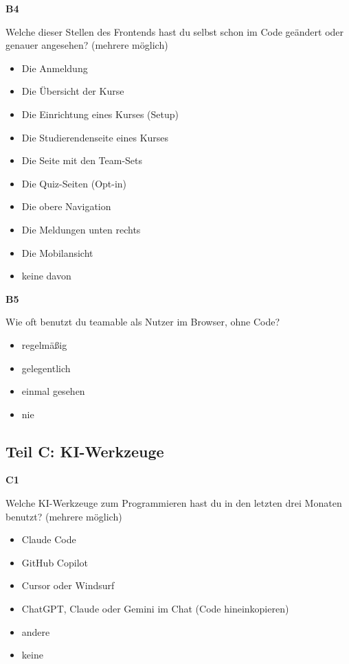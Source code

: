 \noindent\begin{minipage}{\linewidth}
\textbf{B4}\par
Welche dieser Stellen des Frontends hast du selbst schon im Code geändert oder genauer angesehen? (mehrere möglich)

\begin{itemize}[nosep,leftmargin=2.4em]
\item[\kreuz] Die Anmeldung
\item[\kreuz] Die Übersicht der Kurse
\item[\kreuz] Die Einrichtung eines Kurses (Setup)
\item[\kreuz] Die Studierendenseite eines Kurses
\item[\kreuz] Die Seite mit den Team-Sets
\item[\kreuz] Die Quiz-Seiten (Opt-in)
\item[\kreuz] Die obere Navigation
\item[\kreuz] Die Meldungen unten rechts
\item[\kreuz] Die Mobilansicht
\item[\kreuz] keine davon
\end{itemize}
\end{minipage}

\medskip

\noindent\begin{minipage}{\linewidth}
\textbf{B5}\par
Wie oft benutzt du teamable als Nutzer im Browser, ohne Code?

\begin{itemize}[nosep,leftmargin=2.4em]
\item[\kreuz] regelmäßig
\item[\kreuz] gelegentlich
\item[\kreuz] einmal gesehen
\item[\kreuz] nie
\end{itemize}
\end{minipage}

\medskip

\subsection*{Teil C: KI-Werkzeuge}

\noindent\begin{minipage}{\linewidth}
\textbf{C1}\par
Welche KI-Werkzeuge zum Programmieren hast du in den letzten drei Monaten benutzt? (mehrere möglich)

\begin{itemize}[nosep,leftmargin=2.4em]
\item[\kreuz] Claude Code
\item[\kreuz] GitHub Copilot
\item[\kreuz] Cursor oder Windsurf
\item[\kreuz] ChatGPT, Claude oder Gemini im Chat (Code hineinkopieren)
\item[\kreuz] andere
\item[\kreuz] keine
\end{itemize}
\end{minipage}

